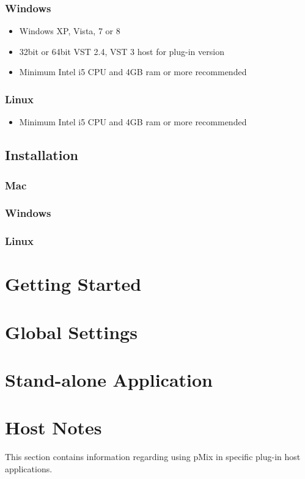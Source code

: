 \documentclass[a4paper,14pt]{report}
\begin{document}
\subsection*{Windows}
\begin{itemize}
\item Windows XP, Vista, 7 or 8
\item 32bit or 64bit VST 2.4, VST 3 host for plug-in version
\item Minimum Intel i5 CPU and 4GB ram or more recommended
\end{itemize}
\subsection*{Linux}
\begin{itemize}
\item Minimum Intel i5 CPU and 4GB ram or more recommended
\end{itemize}

\section{Installation}
\subsection*{Mac}
\subsection*{Windows}
\subsection*{Linux}


\chapter{Getting Started}


\chapter{Global Settings}


\chapter{Stand-alone Application}


\chapter{Host Notes}
This section contains information regarding using pMix in specific plug-in host applications. 
\end{document}
